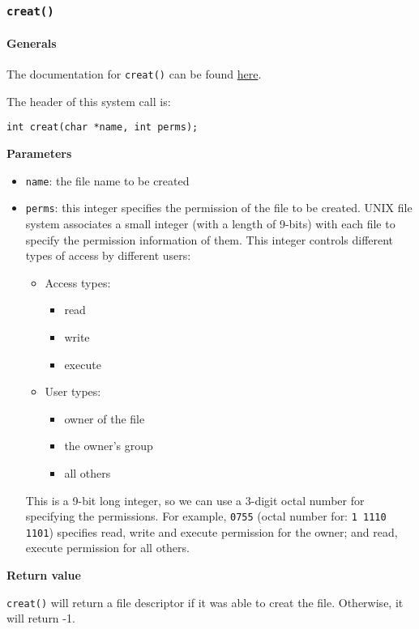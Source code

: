 \documentclass[11pt]{article}
\begin{document}
\subsubsection{\texttt{creat()}}
\label{sec:org7624d0d}
\paragraph{Generals}
\label{sec:org8c80df4}
The documentation for \texttt{creat()} can be found \href{https://linux.die.net/man/3/creat}{here}.

The header of this system call is:
\begin{verbatim}
int creat(char *name, int perms);
\end{verbatim}
\textbf{Parameters}
\begin{itemize}
\item \texttt{name}: the file name to be created
\item \texttt{perms}: this integer specifies the permission of the file to be created. UNIX file system associates a small integer (with a length of 9-bits) with each file to specify the permission information of them. This integer controls different types of access by different users:
\begin{itemize}
\item Access types:
\begin{itemize}
\item read
\item write
\item execute
\end{itemize}
\item User types:
\begin{itemize}
\item owner of the file
\item the owner's group
\item all others
\end{itemize}
\end{itemize}
This is a 9-bit long integer, so we can use a 3-digit octal number for specifying the permissions. For example, \texttt{0755} (octal number for: \texttt{1 1110 1101}) specifies read, write and execute permission for the owner; and read, execute permission for all others.
\end{itemize}


\textbf{Return value}

\texttt{creat()} will return a file descriptor if it was able to creat the file. Otherwise, it will return -1.
\end{document}
